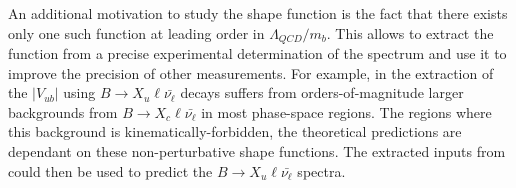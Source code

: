 An additional motivation to study the shape function is the fact that there exists only one such function at leading order in $\Lambda_{QCD}/m_b$.
This allows to extract the function from a precise experimental determination of the \BtoXsgamma spectrum and use it to improve the precision of other measurements.
For example, in the extraction of the $|V_{ub}|$ using $B\rightarrow X_u \ell \bar{\nu_{\ell}}$ decays suffers from orders-of-magnitude larger backgrounds from $B\rightarrow X_c \ell \bar{\nu_{\ell}}$ in most phase-space regions.
The regions where this background is kinematically-forbidden, the theoretical predictions are dependant on these non-perturbative shape functions.
The extracted inputs from \BtoXsgamma could then be used to predict the $B\rightarrow X_u \ell \bar{\nu_{\ell}}$ spectra.


